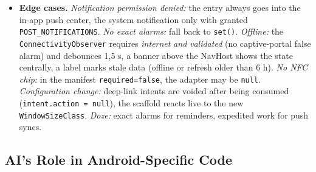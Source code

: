 \documentclass{msereport}
\begin{document}
\begin{itemize}
        pending; the app-side receive path is fully implemented). The
        decision logic (``should this tickle trigger a sync?{}'') is decoupled
        from Firebase and runs as a JVM test. The
        \texttt{FirebaseMessagingService} is instantiated by the SDK, not by
        Hilt, hence its own EntryPoint; it reads preconditions blocking, because
        the callback runs on a background thread anyway. Work happens in an
        \emph{expedited} \texttt{MailPushSyncWorker}
        (\texttt{RUN\_AS\_NON\_EXPEDITED} as a fallback, \texttt{KEEP} against
        tickle bursts), because the service process ends after the callback; the
        worker re-checks the credentials and classifies errors into
        \texttt{retry} and \texttt{failure}. The periodic
        \texttt{LsfSyncWorker} works through courses, timetable, exams and
        the grade report with a 400 ms throttle; auth errors are retried up to
        twice so the CAS session renews silently, a parse error does \emph{not}
        abort the run but produces a deduplicated warning in the push center
        (``exam dates outdated''). The most critical detail sits in the session:
        CAS binds the ticket-granting cookie to the user agent of the issuing
        WebView; without replaying it the server deletes it on the next request.
  \item \textbf{Edge cases.} \emph{Notification permission denied:} the entry
        always goes into the in-app push center, the system notification only
        with granted \texttt{POST\_NOTIFICATIONS}. \emph{No exact alarms:}
        fall back to \texttt{set()}. \emph{Offline:} the
        \texttt{ConnectivityObserver} requires \emph{internet} \emph{and}
        \emph{validated} (no captive-portal false alarm) and debounces 1{,}5 s,
        a banner above the NavHost shows the state centrally, a label marks
        stale data (offline or refresh older than 6 h). \emph{No NFC chip:} in
        the manifest \texttt{required=false}, the adapter may be \texttt{null}.
        \emph{Configuration change:} deep-link intents are voided after being
        consumed (\texttt{intent.action = null}), the scaffold reacts live to
        the new \texttt{WindowSizeClass}. \emph{Doze:} exact alarms for
        reminders, expedited work for push syncs.
\end{itemize}

\subsection{AI's Role in Android-Specific Code}
\end{document}
